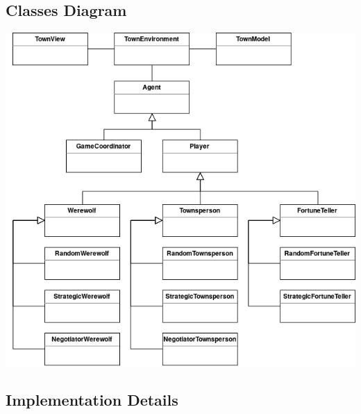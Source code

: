 \documentclass{article}
\begin{document}
\subsection{Classes Diagram}
\begin{center}
\includegraphics[scale=0.5]{./images/class_diagram.png}
\end{center}

\subsection{Implementation Details}
\end{document}
